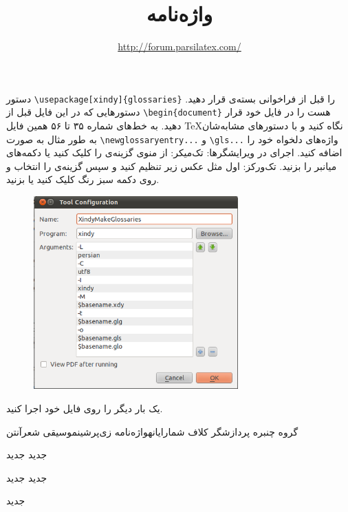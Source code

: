 \documentclass{article}
\begin{document}
\title{ واژه‌نامه  }
\author{\url{http://forum.parsilatex.com/}} 
\date{}
\maketitle
{}

دستور \verb|\usepackage[xindy]{glossaries}| را قبل از فراخوانی بسته‌ی  قرار دهید.
دستورهایی که در این فایل قبل از \verb|\begin{document}| هست را در فایل خود قرار دهید.
به خط‌های شماره ۳۵ تا ۵۶ همین فایل \TeX نگاه کنید و با دستورهای مشابه‌شان به طور مثال  به صورت 
\verb|\newglossaryentry...|
 و 
\verb|\gls...|
 واژه‌های دلخواه خود را اضافه کنید.
اجرای   در ویرایشگرها:
تک‌میکر: از منوی  گزینه‌ی  را کلیک کنید یا دکمه‌های میانبر  را بزنید.
تک‌ورکز: اول مثل عکس زیر تنظیم کنید و سپس گزینه‌ی  را انتخاب و روی دکمه سبز رنگ کلیک کنید یا  بزنید.
\begin{figure}[!h]
\centerline{\includegraphics[width=0.7\textwidth]{Xindy_Make_Glossaries.png}}
\end{figure}
یک بار دیگر \XeLaTeX را روی فایل خود اجرا کنید.


\gls{گروه} \gls{چنبره} \gls{پردازشگر}
\gls{کلاف} \gls{شما}\gls{رایانه}\gls{واژه‌نامه}
\gls{زی‌پرشین}\gls{موسیقی} \gls{شعر}\gls{آنتن}

\printglossaries
‌جدید
\printglossaries
‌جدید

\printglossaries
‌جدید
\printglossaries
‌جدید
\printglossaries

‌جدید
\printglossaries
\end{document}
